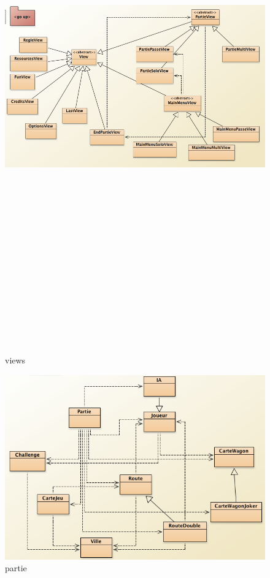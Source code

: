\documentclass{report}
\begin{document}
\begin{figure}[H]
\center
\includegraphics[angle=90,height=650pt]{views.png}
\caption{views}
\label{views}
\end{figure}
\begin{figure}[H]
\center
\includegraphics[angle=90]{partie.png}
\caption{partie}
\label{partie}
\end{figure}
\end{document}
